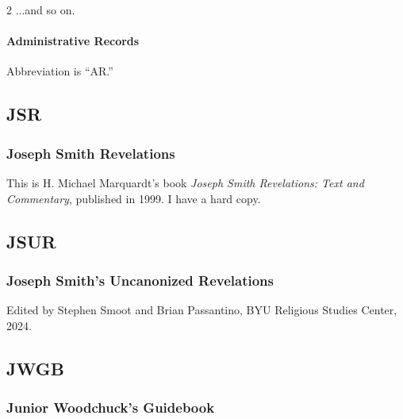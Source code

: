 \begin{multicols}{2}
				...and so on.
			
			\paragraph*{Administrative Records}
			
				Abbreviation is ``AR.''
		
	\subsection*{JSR}

		\subsubsection*{Joseph Smith Revelations}
		
			This is H. Michael Marquardt's book \textit{Joseph Smith Revelations: Text and Commentary}, published in 1999. I have a hard copy.
			
	\subsection*{JSUR}

		\subsubsection*{Joseph Smith's Uncanonized Revelations}
		
			Edited by Stephen Smoot and Brian Passantino, BYU Religious Studies Center, 2024.
			
	\subsection*{JWGB}

		\subsubsection*{Junior Woodchuck's Guidebook}
		

\end{multicols}
